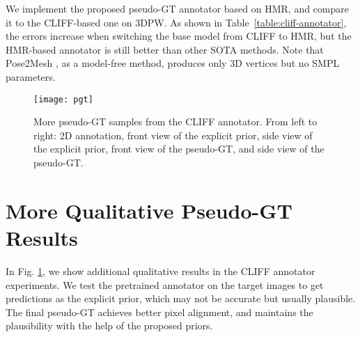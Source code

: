 \documentclass[runningheads]{llncs}
\begin{document}
We implement the proposed pseudo-GT annotator based on HMR, and compare it to the CLIFF-based one on 3DPW.
As shown in Table~\ref{table:cliff-annotator}, the errors increase when switching the base model from CLIFF to HMR, but the HMR-based annotator is still better than other SOTA methods.
Note that Pose2Mesh \cite{choi2020pose2mesh}, as a model-free method, produces only 3D vertices but no SMPL parameters.

\begin{figure}[t]
	\centering
	\texttt{[image: pgt]}
	\caption{More pseudo-GT samples from the CLIFF annotator. From left to right: 2D annotation, front view of the explicit prior, side view of the explicit prior, front view of the pseudo-GT, and side view of the pseudo-GT.}
	\label{fig:pgt}
\end{figure}

\section{More Qualitative Pseudo-GT Results}
In Fig. \ref{fig:pgt}, we show additional qualitative results in the CLIFF annotator experiments. We test the pretrained annotator on the target images to get predictions as the explicit prior, which may not be accurate but usually plausible.
The final pseudo-GT achieves better pixel alignment, and maintains the plausibility with the help of the proposed priors.
\end{document}
